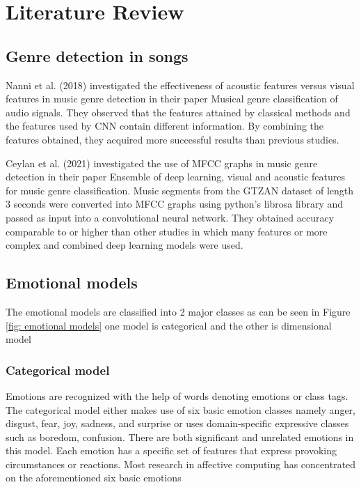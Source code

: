 \chapter{Literature Review}
\section{Genre detection in songs}
Nanni et al. (2018)\cite{nanni_ensemble_2018} investigated the effectiveness of acoustic features versus visual features in music genre detection in their paper Musical genre classification of audio signals. They observed that the features attained by classical methods and the features used by CNN contain different information. By combining the features obtained, they acquired more successful results than previous studies.

Ceylan et al. (2021)\cite{ceylan_automatic_2021} investigated the use of MFCC graphs in music genre detection in their paper Ensemble of deep learning, visual and acoustic features for music genre classification. Music segments from the GTZAN dataset of length 3  seconds were converted into MFCC graphs using python’s librosa library and passed as input into a convolutional neural network. They obtained accuracy comparable to or higher than other studies in which many features or more complex and combined deep learning models were used. 

\section{Emotional models}

The emotional models are classified into 2 major classes as can be seen in Figure \ref{fig: emotional models} one model is categorical and the other is dimensional model \cite{emotion_models}

\subsection{Categorical model}
Emotions are recognized with the help of words denoting emotions or class tags.
The categorical model either makes use of six basic emotion classes namely anger, disgust, fear, joy, sadness, and surprise or uses domain-specific expressive classes such as boredom, confusion. There are both significant and unrelated
emotions in this model. Each emotion has a specific set of features that express provoking circumstances or
reactions. Most research in affective computing has concentrated on the aforementioned six basic emotions
 
